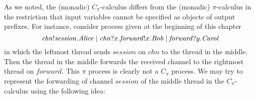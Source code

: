 As we noted, the (monadic) $C_\pi$-calculus differs from the (monadic) $\pi$-calculus in the restriction that input variables cannot be specified as objects of output prefixes. For instance, consider process given at the beginning of this chapter
%
\begin{equation}\label{eq:pi_process_not_Cpi_process}
\mathit{chn}!\mathit{session}.\mathit{Alice} \;|\; \mathit{chn}?x.\mathit{forward}!x.\mathit{Bob}\;|\; \mathit{forward}?y.\mathit{Carol}
\end{equation}
%
%
in which the leftmost thread sends $\mathit{session}$ on $\mathit{chn}$ to the thread in the middle. Then the thread in the middle forwards the received channel to the rightmost thread on $\mathit{forward}$. This $\pi$ process is clearly not a $C_\pi$ process.
%
We may try to represent the forwarding of channel $\mathit{session}$ of the middle thread in the $C_\pi$-calculus using the following idea:



